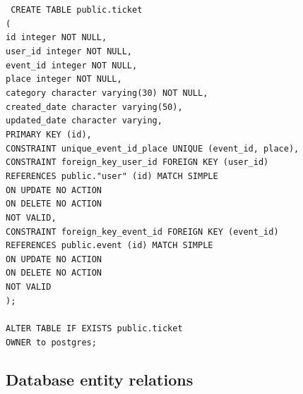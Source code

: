 \texttt{
    CREATE TABLE public.ticket \\
    ( \\
    id integer NOT NULL,\\
    user\_id integer NOT NULL,\\
    event\_id integer NOT NULL,\\
    place integer NOT NULL,\\
    category character varying(30) NOT NULL,\\
    created\_date character varying(50),\\
    updated\_date character varying,\\
    PRIMARY KEY (id),\\
    CONSTRAINT unique\_event\_id\_place UNIQUE (event\_id, place),\\
    CONSTRAINT foreign\_key\_user\_id FOREIGN KEY (user\_id)\\
    REFERENCES public."user" (id) MATCH SIMPLE\\
    ON UPDATE NO ACTION\\
    ON DELETE NO ACTION\\
    NOT VALID,\\
    CONSTRAINT foreign\_key\_event\_id FOREIGN KEY (event\_id)\\
    REFERENCES public.event (id) MATCH SIMPLE\\
    ON UPDATE NO ACTION\\
    ON DELETE NO ACTION\\
    NOT VALID\\
    );\\
    \\
    ALTER TABLE IF EXISTS public.ticket\\
    OWNER to postgres;\\
}

\subsection{Database entity relations}\label{subsec:database-entity-relations}

